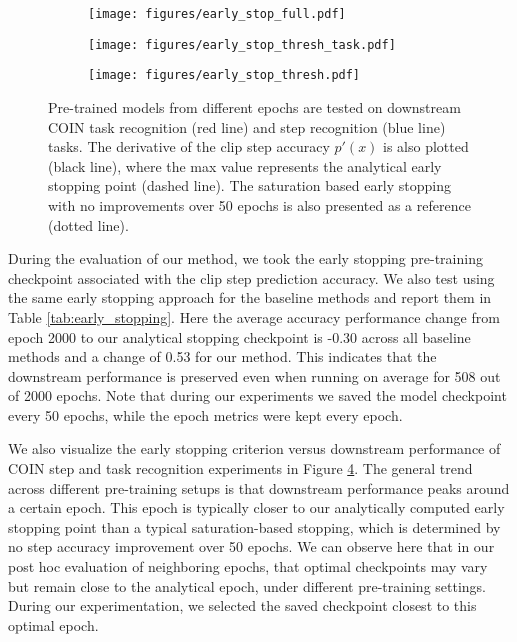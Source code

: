 
\begin{figure}[t]
\centering
\begin{subfigure}{.485\textwidth}
  \centering
  \texttt{[image: figures/early\_stop\_full.pdf]}
  \label{fig:sub1}
\end{subfigure}%
\begin{subfigure}{.515\textwidth}
  \centering
  \texttt{[image: figures/early\_stop\_thresh\_task.pdf]}
  \label{fig:sub2}
\end{subfigure}

\bigskip
\begin{subfigure}{\textwidth}
  \centering
  \texttt{[image: figures/early\_stop\_thresh.pdf]}
  \label{fig:sub3}
\end{subfigure}
\caption{Pre-trained models from different epochs are tested on downstream COIN task recognition (red line) and step recognition (blue line) tasks. The derivative of the clip step accuracy $p'(x)$ is also plotted (black line), where the max value represents the analytical early stopping point (dashed line). The saturation based early stopping with no improvements over 50 epochs is also presented as a reference (dotted line). 
}
\label{fig:early_stopping}
\end{figure}

During the evaluation of our method, we took the early stopping pre-training checkpoint associated with the clip step prediction accuracy. We also test using the same early stopping approach for the baseline methods and report them in Table \ref{tab:early_stopping}. Here the average accuracy performance change from epoch 2000 to our analytical stopping checkpoint is -0.30 across all baseline methods and a change of 0.53 for our \model{} method. This indicates that the downstream performance is preserved even when running on average for 508 out of 2000 epochs. Note that during our experiments we saved the model checkpoint every 50 epochs, while the epoch metrics were kept every epoch. 


We also visualize the early stopping criterion versus downstream performance of COIN step and task recognition experiments in Figure \ref{fig:early_stopping}. The general trend across different pre-training setups is that downstream performance peaks around a certain epoch. This epoch is typically closer to our analytically computed early stopping point than a typical saturation-based stopping, which is determined by no step accuracy improvement over 50 epochs. We can observe here that in our post hoc evaluation of neighboring epochs, that optimal checkpoints may vary but remain close to the analytical epoch, under different pre-training settings. During our experimentation, we selected the saved checkpoint closest to this optimal epoch.

